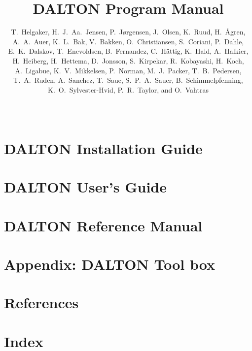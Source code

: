 \documentclass[11pt]{report}
\begin{document}
%

%
\baselineskip=15pt
%
\title{DALTON Program Manual}

%
\author{T.~Helgaker, H.~J.~Aa.~Jensen, P.~J{\o}rgensen, J.~Olsen,
K.~Ruud, H.~{\AA}gren,\smallskip\\ 
A.~A.~Auer,
K.~L.~Bak,
V.~Bakken,
O.~Christiansen,
S.~Coriani,
P.~Dahle,\\
E.~K.~Dalskov,
T.~Enevoldsen,
B.~Fernandez,
C.~H{\"a}ttig,
K.~Hald,
A.~Halkier,\\
H.~Heiberg,
H.~Hettema,
D.~Jonsson,
S.~Kirpekar,
R.~Kobayashi,
H.~Koch,\\
A.~Ligabue,
K.~V.~Mikkelsen,
P.~Norman,
M.~J.~Packer,
T.~B.~Pedersen,\\
T.~A.~Ruden,
A.~Sanchez,
T.~Saue,
S.~P.~A.~Sauer,
B.~Schimmelpfenning,\\
K.~O.~Sylvester-Hvid,
P.~R.~Taylor,
and O.~Vahtras}
%
\date{\mbox{\ }}
%
\maketitle
%



\part{DALTON Installation Guide}


\part{DALTON User's Guide}
















\part{DALTON Reference Manual}




















%


\part{Appendix: DALTON Tool box}

\part{References}

%
\part{Index}
\printindex
\end{document}
